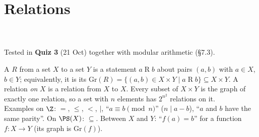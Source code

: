\chapter{Relations}
%
{\\ \\ Tested in \textbf{Quiz 3} (21 Oct) together with modular arithmetic (\S7.3).}


\begin{key}[Relation]
A  $R$ from a set $X$ to a set $Y$ is a statement $a\mathrel Rb$ about pairs $(a,b)$ with $a\in X$, $b\in Y$; equivalently, it is its  $\mathrm{Gr}(R)=\{(a,b)\in X\times Y\mid a\mathrel Rb\}\subseteq X\times Y$. A relation \emph{on} $X$ is a relation from $X$ to $X$. Every subset of $X\times Y$ is the graph of exactly one relation, so a set with $n$ elements has $2^{n^2}$ relations on it.\\
Examples on $\Z$: $=$, $\le$, $<$, $\mid$, ``$a\equiv b\pmod n$'' (\ie $n\mid a-b$), ``$a$ and $b$ have the same parity''. On $\PS(X)$: $\subseteq$. Between $X$ and $Y$: ``$f(a)=b$'' for a function $f:X\to Y$ (its graph is $\mathrm{Gr}(f)$).
\end{key}

